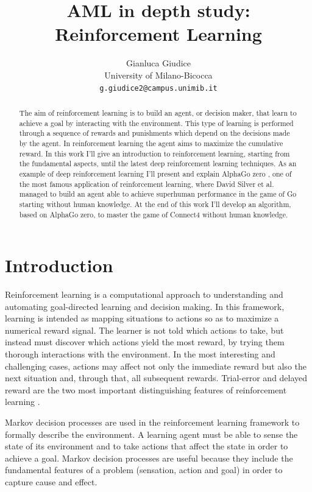 \documentclass{article}
\title{AML in depth study: Reinforcement Learning}
\author{
 Gianluca Giudice\\
  University of Milano-Bicocca\\
  \texttt{g.giudice2@campus.unimib.it} \\
}
\begin{document}
\maketitle
\begin{abstract}
The aim of reinforcement learning is to build an agent, or decision maker, that learn to achieve a goal by interacting with the environment. This type of learning is performed through a sequence of rewards and punishments which depend on the decisions made by the agent. In reinforcement learning the agent aims to maximize the cumulative reward. In this work I'll give an introduction to reinforcement learning, starting from the fundamental aspects, until the latest deep reinforcement learning techniques. As an example of deep reinforcement learning I'll present and explain AlphaGo zero \cite{silver2017mastering}, one of the most famous application of reinforcement learning, where David Silver et al. managed to build an agent able to achieve superhuman performance in the game of Go starting without human knowledge. At the end of this work I'll develop an algorithm, based on AlphaGo zero, to master the game of Connect4 without human knowledge.
\end{abstract}

\section{Introduction}

Reinforcement learning is a computational approach to understanding and automating goal-directed learning and decision making. In this framework, learning is intended as mapping situations to actions so as to maximize a numerical reward signal. The learner is not told which actions to take, but instead must discover which actions yield the most reward, by trying them thorough interactions with the environment. In the most interesting and challenging cases, actions may affect not only the immediate reward but also the next situation and, through that, all subsequent rewards. Trial-error and delayed reward  are the two most important distinguishing features of reinforcement learning \cite{10.5555/3312046}.

Markov decision processes are used in the reinforcement learning framework to formally describe the environment. A learning agent must be able to sense the state of its environment and to take actions that affect the state in order to achieve a goal. Markov decision processes are useful because  they include the  fundamental features of a problem (sensation, action and goal) in order to capture cause and effect. 
\end{document}
